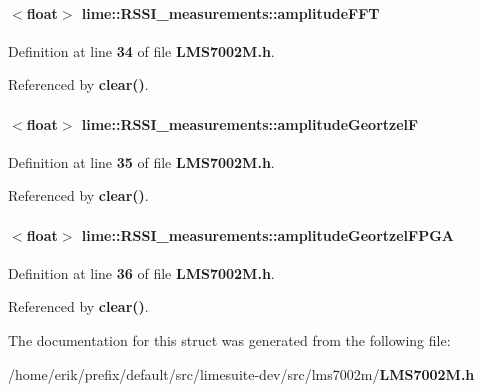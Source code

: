 \paragraph[{amplitude\+F\+FT}]{$<$float$>$ lime\+::\+R\+S\+S\+I\+\_\+measurements\+::amplitude\+F\+FT}\label{structlime_1_1RSSI__measurements_a4f4dfcf90fc4424d4d38e9051c2332c6}


Definition at line {\bf 34} of file {\bf L\+M\+S7002\+M.\+h}.



Referenced by {\bf clear()}.

\paragraph[{amplitude\+GeortzelF}]{$<$float$>$ lime\+::\+R\+S\+S\+I\+\_\+measurements\+::amplitude\+GeortzelF}\label{structlime_1_1RSSI__measurements_a1660c9c6ac4af4f5267f6b5477ec1d8a}


Definition at line {\bf 35} of file {\bf L\+M\+S7002\+M.\+h}.



Referenced by {\bf clear()}.

\paragraph[{amplitude\+Geortzel\+F\+P\+GA}]{$<$float$>$ lime\+::\+R\+S\+S\+I\+\_\+measurements\+::amplitude\+Geortzel\+F\+P\+GA}\label{structlime_1_1RSSI__measurements_ab21771a116937d957b6543f96e421295}


Definition at line {\bf 36} of file {\bf L\+M\+S7002\+M.\+h}.



Referenced by {\bf clear()}.



The documentation for this struct was generated from the following file\+:\begin{DoxyCompactItemize}
\item 
/home/erik/prefix/default/src/limesuite-\/dev/src/lms7002m/{\bf L\+M\+S7002\+M.\+h}\end{DoxyCompactItemize}
